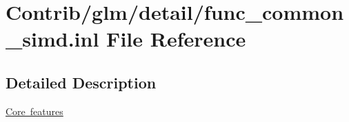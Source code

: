 \hypertarget{func__common__simd_8inl}{}\section{Contrib/glm/detail/func\+\_\+common\+\_\+simd.inl File Reference}
\label{func__common__simd_8inl}


\subsection{Detailed Description}
\mbox{\hyperlink{group__core}{Core features}} 